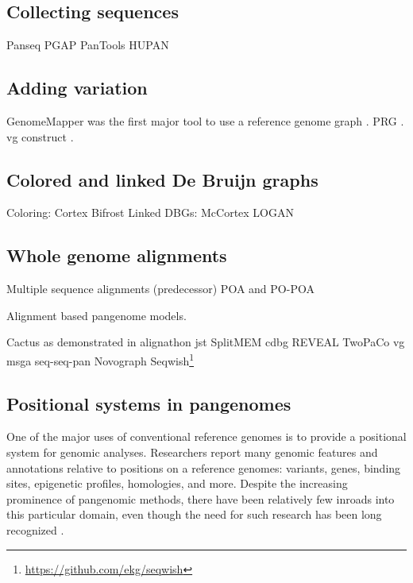 \subsection{Collecting sequences}

Panseq \cite{Laing_2010}
PGAP \cite{Zhao_2011}
PanTools  \cite{Sheikhizadeh_Anari_2018}
HUPAN \citep{Duan_2019}

\subsection{Adding variation}

GenomeMapper was the first major tool to use a reference genome graph \cite{Schneeberger_2009}.
PRG \cite{dilthey2015improved}.
vg construct \cite{Garrison_2018}.

\subsection{Colored and linked De Bruijn graphs}

Coloring:
Cortex \cite{Iqbal_2012}
Bifrost \cite{holley2019bifrost}
Linked DBGs:
McCortex \cite{Turner_2018}
LOGAN \cite{Bolger_2017}

\subsection{Whole genome alignments}

Multiple sequence alignments (predecessor) POA and PO-POA \cite{Lee_2002,Grasso_2004} %

Alignment based pangenome models.

Cactus \cite{Paten_2011} as demonstrated in alignathon \cite{earl2014alignathon}
jst \cite{Rahn_2014}
SplitMEM \cite{Marcus_2014}
cdbg \cite{Baier_2015}
REVEAL \cite{linthorst2015scalable}
TwoPaCo \cite{Minkin_2016}
vg msga \cite{Novak_2017a,Garrison_2018,Garrison_2019}
seq-seq-pan \cite{Jandrasits_2018}
Novograph \cite{Biederstedt2018}
Seqwish\footnote{\url{https://github.com/ekg/seqwish}} \cite{Garrison_2019}


\subsection{Positional systems in pangenomes}

One of the major uses of conventional reference genomes is to provide a positional system for genomic analyses.
Researchers report many genomic features and annotations relative to positions on a reference genomes: variants, genes, binding sites, epigenetic profiles, homologies, and more.
Despite the increasing prominence of pangenomic methods, there have been relatively few inroads into this particular domain, even though the need for such research has been long recognized \cite{computational2016computational}. 

